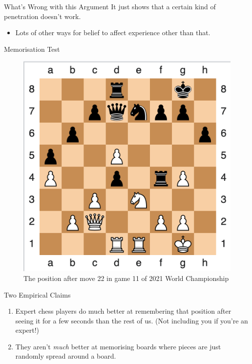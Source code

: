 \documentclass[
  17pt,
  letterpaper,
  ignorenonframetext,
  aspectratio=169,
  handout,
  xcolor={dvipsnames}]{beamer}
\providecommand{\tightlist}{%
  \setlength{\itemsep}{0pt}\setlength{\parskip}{0pt}}\usepackage{longtable,booktabs,array}
\begin{document}
\begin{frame}{What's Wrong with this Argument}
\protect\hypertarget{whats-wrong-with-this-argument}{}
It just shows that a certain kind of penetration doesn't work.

\begin{itemize}[<+->]
\tightlist
\item
  Lots of other ways for belief to affect experience other than that.
\end{itemize}
\end{frame}

\begin{frame}[plain]{Memorisation Test}
\protect\hypertarget{memorisation-test}{}
\begin{figure}

{\centering \includegraphics[width=\textwidth,height=0.8\textheight]{../images/chess_gm11.png}

}

\caption{The position after move 22 in game 11 of 2021 World
Championship}

\end{figure}
\end{frame}

\begin{frame}{Two Empirical Claims}
\protect\hypertarget{two-empirical-claims}{}
\begin{enumerate}[<+->]
\tightlist
\item
  Expert chess players do much better at remembering that position after
  seeing it for a few seconds than the rest of us. (Not including you if
  you're an expert!)
\item
  They aren't \emph{much} better at memorising boards where pieces are
  just randomly spread around a board.
\end{enumerate}
\end{frame}
\end{document}
